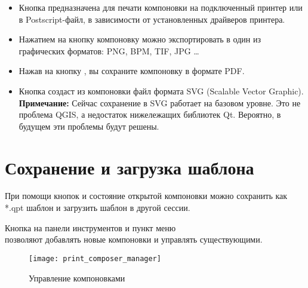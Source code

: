 \begin{itemize}[label=--]
\item Кнопка  предназначена для
печати компоновки на подключенный принтер или в Postscript-файл, в
зависимости от установленных драйверов принтера.
\item Нажатием на кнопку
компоновку можно экспортировать в один из графических форматов: PNG,
BPM, TIF, JPG \ldots
\item Нажав на кнопку , вы
сохраните компоновку в формате PDF.
\item Кнопка  создаст из
компоновки файл формата SVG (Scalable Vector Graphic).
\textbf{Примечание:} Сейчас сохранение в SVG работает на базовом уровне.
Это не проблема QGIS, а недостаток нижележащих библиотек Qt. Вероятно,
в будущем эти проблемы будут решены.
\end{itemize}

\section{Сохранение и загрузка шаблона}

При помощи кнопок 
и  состояние открытой
компоновки можно сохранить как *.qpt шаблон и загрузить шаблон в другой
сессии.

Кнопка 
на панели инструментов и пункт меню \\
 \arrow {}
позволяют добавлять новые компоновки и управлять существующими.

\begin{figure}[h]
   \centering
   \texttt{[image: print\_composer\_manager]}
   \caption{Управление компоновками \wincaption}
   \label{fig:print_composer_manager}
\end{figure}

\FloatBarrier
